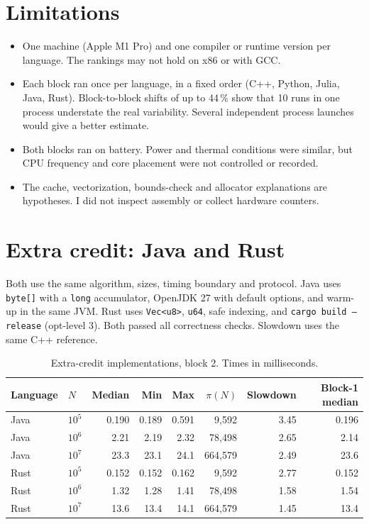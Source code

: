 \documentclass[11pt,a4paper]{article}
\newcommand{\code}[1]{\texttt{#1}}
\newcommand{\tenp}[1]{10^{#1}}
\begin{document}
\section{Limitations}
\begin{itemize}
  \item One machine (Apple M1 Pro) and one compiler or runtime version per language. The rankings
        may not hold on x86 or with GCC.
  \item Each block ran once per language, in a fixed order (C++, Python, Julia, Java, Rust).
        Block-to-block shifts of up to 44\,\% show that 10 runs in one process understate the real
        variability. Several independent process launches would give a better estimate.
  \item Both blocks ran on battery. Power and thermal conditions were similar, but CPU frequency and
        core placement were not controlled or recorded.
  \item The cache, vectorization, bounds-check and allocator explanations are hypotheses. I did not
        inspect assembly or collect hardware counters.
\end{itemize}

\appendix
\section{Extra credit: Java and Rust}

Both use the same algorithm, sizes, timing boundary and protocol. Java uses \code{byte[]} with a
\code{long} accumulator, OpenJDK 27 with default options, and warm-up in the same JVM. Rust uses
\code{Vec<u8>}, \code{u64}, safe indexing, and \code{cargo build --release} (opt-level 3). Both
passed all correctness checks. Slowdown uses the same C++ reference.

\begin{table}[H]
\centering
\caption{Extra-credit implementations, block 2. Times in milliseconds.}
\begin{tabular}{llrrrrrr}
\toprule
Language & $N$ & Median & Min & Max & $\pi(N)$ & Slowdown & Block-1 median \\
\midrule
Java & $\tenp{5}$ & 0.190 & 0.189 & 0.591 & 9,592   & 3.45 & 0.196 \\
Java & $\tenp{6}$ & 2.21  & 2.19  & 2.32  & 78,498  & 2.65 & 2.14  \\
Java & $\tenp{7}$ & 23.3  & 23.1  & 24.1  & 664,579 & 2.49 & 23.6  \\
\midrule
Rust & $\tenp{5}$ & 0.152 & 0.152 & 0.162 & 9,592   & 2.77 & 0.152 \\
Rust & $\tenp{6}$ & 1.32  & 1.28  & 1.41  & 78,498  & 1.58 & 1.54  \\
Rust & $\tenp{7}$ & 13.6  & 13.4  & 14.1  & 664,579 & 1.45 & 13.4  \\
\bottomrule
\end{tabular}
\end{table}
\end{document}
